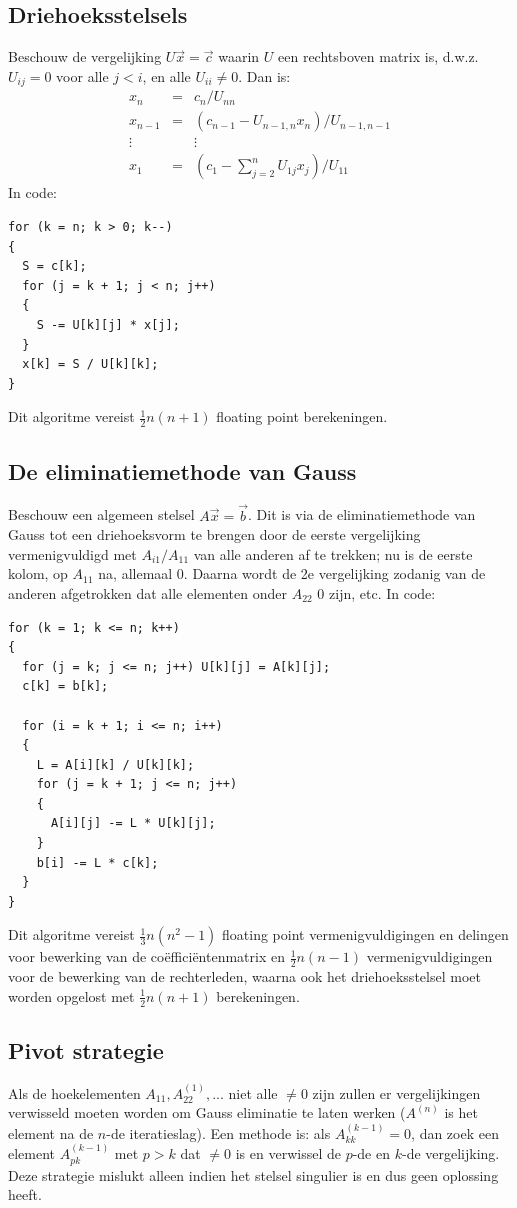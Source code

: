 \documentclass[twoside]{report}
\begin{document}
\subsection{Driehoeksstelsels}
Beschouw de vergelijking $U\vec{x}=\vec{c}$ waarin $U$ een rechtsboven matrix
is, d.w.z. $U_{ij}=0$ voor alle $j<i$, en alle $U_{ii}\neq0$. Dan is:
\begin{eqnarray*}
x_n    &=&c_n/U_{nn}\\
x_{n-1}&=&(c_{n-1}-U_{n-1,n}x_n)/U_{n-1,n-1}\\
\vdots & &\vdots\\
x_1    &=&(c_1-\sum_{j=2}^nU_{1j}x_j)/U_{11}
\end{eqnarray*}
In code:
\begin{verbatim}
for (k = n; k > 0; k--)
{
  S = c[k];
  for (j = k + 1; j < n; j++)
  {
    S -= U[k][j] * x[j];
  }
  x[k] = S / U[k][k];
}
\end{verbatim}
Dit algoritme vereist $\frac{1}{2}n(n+1)$ floating point berekeningen.

\subsection{De eliminatiemethode van Gauss}
Beschouw een algemeen stelsel $A\vec{x}=\vec{b}$. Dit is via de eliminatiemethode
van Gauss tot een driehoeksvorm te brengen door de eerste vergelijking
vermenigvuldigd met $A_{i1}/A_{11}$ van alle anderen af te trekken; nu is de
eerste kolom, op $A_{11}$ na, allemaal 0. Daarna wordt de 2e vergelijking zodanig
van de anderen afgetrokken dat alle elementen onder $A_{22}$ 0 zijn, etc.
In code:
\begin{verbatim}
for (k = 1; k <= n; k++)
{
  for (j = k; j <= n; j++) U[k][j] = A[k][j];
  c[k] = b[k];

  for (i = k + 1; i <= n; i++)
  {
    L = A[i][k] / U[k][k];
    for (j = k + 1; j <= n; j++)
    {
      A[i][j] -= L * U[k][j];
    }
    b[i] -= L * c[k];
  }
}
\end{verbatim}
Dit algoritme vereist $\frac{1}{3}n(n^2-1)$ floating point vermenigvuldigingen
en delingen voor bewerking van de co\"effici\"entenmatrix en $\frac{1}{2}n(n-1)$
vermenigvuldigingen voor de bewerking van de rechterleden, waarna ook het
driehoeksstelsel moet worden opgelost met $\frac{1}{2}n(n+1)$ berekeningen.

\subsection{Pivot strategie}
Als de hoekelementen $A_{11}, A^{(1)}_{22},...$ niet alle $\neq0$ zijn zullen
er vergelijkingen verwisseld moeten worden om Gauss eliminatie te laten werken
($A^{(n)}$ is het element na de $n$-de iteratieslag).
Een methode is: als $A^{(k-1)}_{kk}=0$, dan zoek een element $A^{(k-1)}_{pk}$
met $p>k$ dat $\neq0$ is en verwissel de $p$-de en $k$-de vergelijking. Deze
strategie mislukt alleen indien het stelsel singulier is en dus geen oplossing
heeft.
\end{document}
